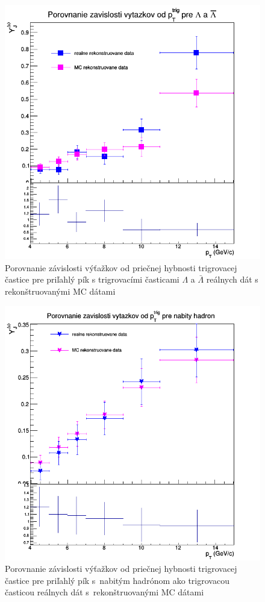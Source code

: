 \documentclass[thesismargins, thesislinespacing]{rnthesis}
\begin{document}
\begin{figure}[hbtp!]
	\centering
	\includegraphics[scale=0.4]{./Obrazky_praca/Vytazok_porovnanieMCl.png}
	\caption{Porovnanie závislosti výťažkov od priečnej hybnosti trigrovacej častice pre priľahlý pík s trigrovacími časticami $\Lambda$ a $\bar{\Lambda}$ reálnych dát s rekonštruovanými MC dátami}
	\label{porovnanieL}
\end{figure}

\begin{figure}[hbtp!]
	\centering
	\includegraphics[scale=0.4]{./Obrazky_praca/Vytazok_porovnanieMCh.png}
	\caption{Porovnanie závislosti výťažkov od priečnej hybnosti trigrovacej častice pre priľahlý pík s~nabitým hadrónom ako trigrovacou časticou reálnych dát s~rekonštruovanými MC dátami}
	\label{porovnanieh}
\end{figure}
\end{document}
